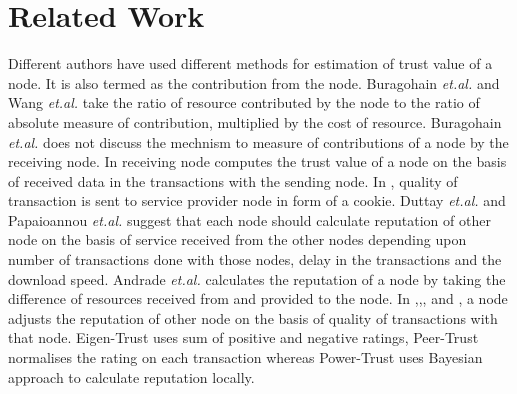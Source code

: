\documentclass{IEEEtran}
\begin{document}
\section{Related Work}
Different authors  have used different methods for estimation of
trust value of a node. It is also termed as the contribution from the node.
Buragohain \emph{et.al.} \cite{A Game Theoretic: Chiranjeeb} and Wang
\emph{et.al.} \cite{to play or to control} take the ratio of resource
contributed by the node to the ratio of absolute measure of contribution, 
multiplied by the cost of resource. Buragohain \emph{et.al.} does not discuss
the mechnism to measure of contributions of a node by the receiving node. In
\cite{Cooperative Peer Groups in NICE} receiving node computes the trust value
of a node on the basis of received data in the transactions with the sending
node. In \cite{Cooperative Peer Groups in NICE}, quality of transaction is sent
to service provider node in form of a cookie. Duttay \emph{et.al.} \cite{The
Design of A Distributed Rating Scheme for Peer-to-peer Systems} and Papaioannou
\emph{et.al.} \cite{Reputation based policies} suggest that each node should
calculate reputation of other node on the basis of service received from the other nodes depending upon
number of transactions done with those nodes, delay in the transactions and the
download speed. Andrade \emph{et.al.} \cite{Discouraging free riding in a
peer-to-peer CPU-sharing grid} calculates the reputation of a node by taking the
difference of resources received from and provided to the node. In \cite{Limited
Reputation Sharing in P2P
Systems},\cite{eigentrust},\cite{PEERTRUST},\cite{powertrust} and \cite{gossiptrust}, 
a node adjusts the reputation of other node on the basis of quality of transactions
with that node. Eigen-Trust \cite{eigentrust} uses sum of positive and negative
ratings, Peer-Trust \cite {PEERTRUST} normalises the rating on each transaction
whereas Power-Trust \cite{powertrust} uses Bayesian approach to calculate reputation locally.
\end{document}
